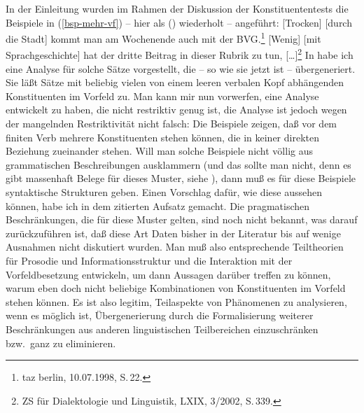 In der Einleitung wurden im Rahmen der Diskussion der Konstituententests die Beispiele
in (\ref{bsp-mehr-vf}) -- hier als () wiederholt -- angeführt:
\eal
\ex {}[Trocken] [durch die Stadt] kommt man am Wochenende auch mit der BVG.\footnote{
        taz berlin, 10.07.1998, S.\,22.
      }
\ex {}[Wenig] [mit Sprachgeschichte] hat der dritte Beitrag in dieser Rubrik zu tun, [\ldots]\footnote{
  ZS für Dialektologie und Linguistik, LXIX, 3/2002, S.\,339.
}
\zl
In  habe ich eine Analyse für solche Sätze vorgestellt, die -- so wie sie jetzt ist --
übergeneriert. Sie läßt Sätze mit beliebig vielen von einem leeren verbalen Kopf abhängenden
Konstituenten im Vorfeld zu. Man kann mir nun vorwerfen, eine Analyse entwickelt zu haben,
die nicht restriktiv genug ist, die Analyse ist jedoch wegen der mangelnden Restriktivität 
nicht falsch: Die Beispiele zeigen, daß vor dem finiten Verb mehrere Konstituenten stehen können,
die in keiner direkten Beziehung zueinander stehen. Will man solche Beispiele nicht völlig aus grammatischen
Beschreibungen ausklammern (und das sollte man nicht, denn es gibt massenhaft Belege für dieses Muster,
siehe ), dann muß es für diese Beispiele syntaktische Strukturen geben. Einen
Vorschlag dafür, wie diese aussehen können, habe ich in dem zitierten Aufsatz gemacht. Die pragmatischen
Beschränkungen, die für diese Muster gelten, sind noch nicht bekannt, was darauf zurückzuführen ist, daß
diese Art Daten bisher in der Literatur bis auf wenige Ausnahmen nicht diskutiert wurden. Man muß
also entsprechende Teiltheorien für Prosodie und Informationsstruktur und die Interaktion mit
der Vorfeldbesetzung entwickeln, um dann Aussagen darüber treffen zu können, warum eben doch nicht
beliebige Kombinationen von Konstituenten im Vorfeld stehen können.
Es ist also legitim, Teilaspekte von Phänomenen zu analysieren, wenn es möglich ist, Übergenerierung
durch die Formalisierung weiterer Beschränkungen aus anderen linguistischen Teilbereichen einzuschränken bzw.\
ganz zu eliminieren.

